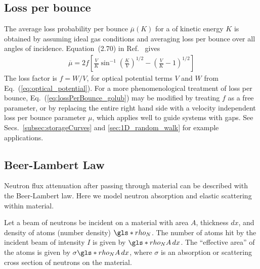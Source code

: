 
\subsection{Loss per bounce}\label{sec:loss_per_bounce}


The average loss probability per bounce $\overline{\mu}(K)$ for a \ucn of kinetic energy $K$ is obtained by assuming ideal gas conditions and averaging loss per bounce over all angles of incidence. Equation~(2.70) in Ref.~\cite{golubUCN} gives
%
\begin{gather}
    \overline{\mu} = 2f \left[ \frac{V}{K} \sin^{-1}\left( \frac{K}{V}\right)^{1/2} -\left( \frac{V}{K} - 1 \right)^{1/2} \right] \label{eq:lossPerBounce_golub}
\end{gather}
%
The loss factor is $f=W/V$, for optical potential terms $V$ and $W$ from Eq.~(\ref{eq:optical_potential}). For a more phenomenological treatment of loss per bounce, Eq.~(\ref{eq:lossPerBounce_golub}) may be modified by treating $f$ as a free parameter, or by replacing the entire right hand side with a velocity independent loss per bounce parameter $\mu$, which applies well to guide systems with gaps. See Secs.~\ref{subsec:storageCurves} and \ref{sec:1D_random_walk} for example applications.


\subsection{Beer-Lambert Law}\label{sec:beer_lambert_law}


Neutron flux attenuation after passing through material can be described with the Beer-Lambert law. Here we model neutron absorption and elastic scattering within material.

Let a beam of neutrons be incident on a material with area $A$, thickness $dx$, and density of atoms (number density) $\gls*{rho_N}$. The number of atoms hit by the incident beam of intensity $I$ is given by $\gls*{rho_N} A\,dx$. The ``effective area'' of the atoms is given by $\sigma \gls*{rho_N} A \, dx$, where $\sigma$ is an absorption or scattering cross section of neutrons on the material.

